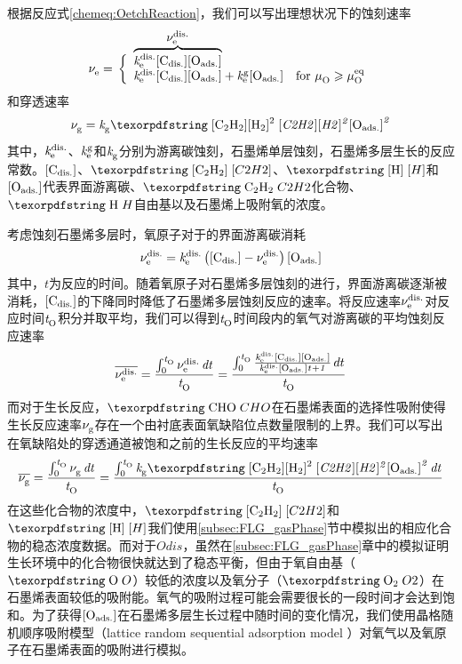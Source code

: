 根据反应式\ref{chemeq:OetchReaction}，我们可以写出理想状况下的蚀刻速率\chinesecolon
\begin{equation}
    \RateV{e}{}=\rule[0ex]{0ex}{8ex}\left\{
        \begin{array}{ll}
        \smash[t]{\overbrace{\RateK{e}{dis.}\Cdis\Oads}^{\mathclap{{\mbox{\normalsize $\RateV{e}{dis.}$}}}}} & \mbox{}  \\
        \smash[b]{\RateK{e}{dis.}\Cdis\Oads+\RateK{e}{g}\Oads} & \mbox{for $\muO{} \geqslant \muO{eq}$} 
        \end{array}\right.
\end{equation}
和穿透速率\chinesecolon
\begin{equation}
    \RateV{g}{}=\RateK{g}{}\cemb{[C2H2][H2]^2}\Oads^2
\end{equation}
其中，$\it{k_{\rm e}^{\rm dis.}} \it$、$\it{k_{\rm e}^{\rm g}} \it$和$\it{k_{\rm g}^{\rm }} \it$分别为游离碳蚀刻，石墨烯单层蚀刻，石墨烯多层生长的反应常数。$\rm{\left[C_{dis.}\right]} \it$、$\cemb{[C2H2]}$、$\cemb{[H]}$和$\rm{\left[O_{ads.}\right]} \it$代表界面游离碳、$\cemb{C2H2}$化合物、$\cemb{H}$自由基以及石墨烯上吸附氧的浓度。

考虑蚀刻石墨烯多层时，氧原子对于的界面游离碳消耗\chinesecolon
\begin{equation}
    \it \nu_{\rm e}^{\rm dis.} \it=\it{k_{\rm e}^{\rm dis.}} \it\left(\rm{\left[C_{dis.}\right]} \it-\it \nu_{\rm e}^{\rm dis.} \it\right)\rm{\left[O_{ads.}\right]} \it
\end{equation}
其中，$t$为反应的时间。随着氧原子对石墨烯多层蚀刻的进行，界面游离碳逐渐被消耗，$\rm{\left[C_{dis.}\right]} \it$的下降同时降低了石墨烯多层蚀刻反应的速率。将反应速率$\it \nu_{\rm e}^{\rm dis.} \it$对反应时间$\it{t_{\rm O}^{\rm }} \it$积分并取平均，我们可以得到$\it{t_{\rm O}^{\rm }} \it$时间段内的氧气对游离碳的平均蚀刻反应速率\chinesecolon
\begin{equation}
    \overline{\it \nu_{\rm e}^{\rm dis.} \it}=\frac{\int_{0}^{\it{t_{\rm O}^{\rm }} \it} \it \nu_{\rm e}^{\rm dis.} \it \,dt }{\it{t_{\rm O}^{\rm }} \it}=\frac{\int_{0}^{\it{t_{\rm O}^{\rm }} \it} \frac{\it{k_{\rm e}^{\rm dis.}} \it\rm{\left[C_{dis.}\right]} \it\rm{\left[O_{ads.}\right]} \it}{\it{k_{\rm e}^{\rm dis.}} \it\rm{\left[O_{ads.}\right]} \it \it{t_{\rm }^{\rm }} \it + 1} \,dt}{\it{t_{\rm O}^{\rm }} \it}
\end{equation}
而对于生长反应，$\cemb{CHO}$在石墨烯表面的选择性吸附使得生长反应速率$\it \nu_{\rm g}^{\rm } \it$存在一个由衬底表面氧缺陷位点数量限制的上界。我们可以写出在氧缺陷处的穿透通道被饱和之前的生长反应的平均速率\chinesecolon
\begin{equation}
    \overline{\RateV{g}{}}=\frac{\int_{0}^{\ReactTime{O}{}} \RateV{g}{} \,dt }{\ReactTime{O}{}}= \frac{\int_{0}^{\ReactTime{O}{}} \RateK{g}{}\cemb{[C2H2][H2]^2}\Oads^2 \,dt }{\ReactTime{O}{}}
\end{equation}
在这些化合物的浓度中，$\cemb{[C2H2]}$和$\cemb{[H]}$我们使用\ref{subsec:FLG_gasPhase}节中模拟出的相应化合物的稳态浓度数据。而对于$Odis$，虽然在\ref{subsec:FLG_gasPhase}章中的模拟证明生长环境中的化合物很快就达到了稳态平衡，但由于氧自由基（$\cemb{O}$）较低的浓度以及氧分子（$\cemb{O2}$）在石墨烯表面较低的吸附能。氧气的吸附过程可能会需要很长的一段时间才会达到饱和。为了获得$\rm{\left[O_{ads.}\right]} \it$在石墨烯多层生长过程中随时间的变化情况，我们使用晶格随机顺序吸附模型（lattice random sequential adsorption model ）对氧气以及氧原子在石墨烯表面的吸附进行模拟。

